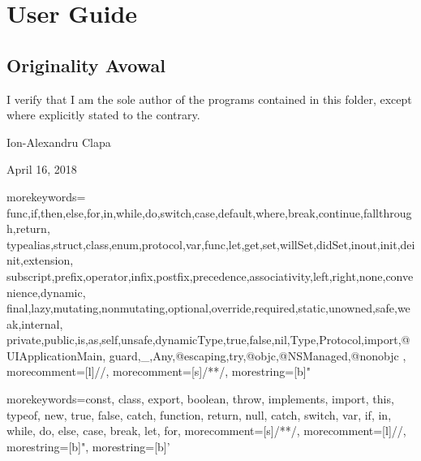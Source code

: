 \chapter{User Guide}
\clearpage

\section{Originality Avowal}
I verify that I am the sole author of the programs contained in this folder, except where explicitly stated to the contrary.

\begin{flushright}
\par Ion-Alexandru Clapa
\par April 16, 2018
\end{flushright}

\clearpage

\lstlistoflistings

\clearpage

{
  morekeywords={
    func,if,then,else,for,in,while,do,switch,case,default,where,break,continue,fallthrough,return,
    typealias,struct,class,enum,protocol,var,func,let,get,set,willSet,didSet,inout,init,deinit,extension,
    subscript,prefix,operator,infix,postfix,precedence,associativity,left,right,none,convenience,dynamic,
    final,lazy,mutating,nonmutating,optional,override,required,static,unowned,safe,weak,internal,
    private,public,is,as,self,unsafe,dynamicType,true,false,nil,Type,Protocol,import,@UIApplicationMain,
    guard,_,Any,@escaping,try,@objc,@NSManaged,@nonobjc
  },
  morecomment=[l]{//}, %
  morecomment=[s]{/*}{*/}, %
  morestring=[b]" %
}

{
  morekeywords={const, class, export, boolean, throw, implements, import, this, typeof, new, true, false, catch, function, return, null, catch, switch, var, if, in, while, do, else, case, break, let, for},
  morecomment=[s]{/*}{*/},
  morecomment=[l]//,
  morestring=[b]",
  morestring=[b]'
}


